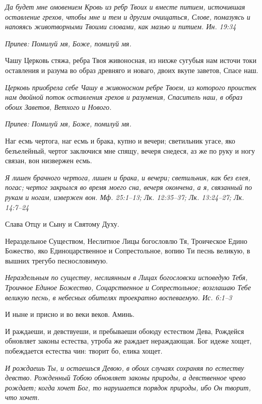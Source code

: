 \itshape Да будет мне омовением Кровь из ребр Твоих и вместе питием, источившая оставление грехов, чтобы мне и тем и другим очищаться, Слове, помазуясь и напояясь животворными Твоими словами, как мазью и питием. Ин. 19:34\normalfont{}


\itshape Припев:\normalfont{} Помилуй мя, Боже, помилуй мя.


Чашу Церковь стяжа, ребра Твоя живоносная, из нихже сугубыя нам источи токи оставления и разума во образ древняго и новаго, двоих вкупе заветов, Спасе наш.


\itshape Церковь приобрела себе Чашу в живоносном ребре Твоем, из которого проистек нам двойной поток оставления грехов и разумения, Спаситель наш, в образ обоих Заветов, Ветхого и Нового.\normalfont{}


\itshape Припев:\normalfont{} Помилуй мя, Боже, помилуй мя.


Наг есмь чертога, наг есмь и брака, купно и вечери; светильник угасе, яко безъелейный, чертог заключися мне спящу, вечеря снедеся, аз же по руку и ногу связан, вон низвержен есмь.


\itshape Я лишен брачного чертога, лишен и брака, и вечери; светильник, как без елея, погас; чертог закрылся во время моего сна, вечеря окончена, а я, связанный по рукам и ногам, извержен вон. Мф. 25:1–13; Лк. 12:35–37; Лк. 13:24–27; Лк. 14:7–24\normalfont{}


Слава Отцу и Сыну и Святому Духу.


Нераздельное Существом, Неслитное Лицы богословлю Тя, Троическое Едино Божество, яко Единоцарственное и Сопрестольное, вопию Ти песнь великую, в вышних трегубо песнословимую.


\itshape Нераздельным по существу, неслиянным в Лицах богословски исповедую Тебя, Троичное Единое Божество, Соцарственное и Сопрестольное; возглашаю Тебе великую песнь, в небесных обителях троекратно воспеваемую. Ис. 6:1–3\normalfont{}


И ныне и присно и во веки веков. Аминь.


И раждаеши, и девствуеши, и пребываеши обоюду естеством Дева, Рождейся обновляет законы естества, утроба же раждает нераждающая. Бог идеже хощет, побеждается естества чин: творит бо, елика хощет.


\itshape И рождаешь Ты, и остаешься Девою, в обоих случаях сохраняя по естеству девство. Рожденный Тобою обновляет законы природы, а девственное чрево рождает; когда хочет Бог, то нарушается порядок природы, ибо Он творит, что хочет.\normalfont{}





